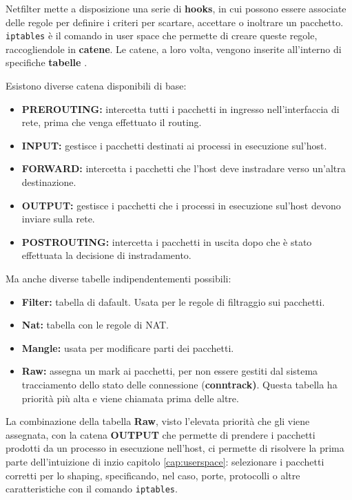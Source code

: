 \begin{defn}[Iptables]
  Netfilter mette a disposizione una serie di \textbf{hooks}, in cui possono essere associate delle regole per definire i criteri per scartare, accettare o inoltrare un pacchetto. \\
  \texttt{iptables} è il comando in user space che permette di creare queste regole, raccogliendole in \textbf{catene}.
  Le catene, a loro volta, vengono inserite all'interno di specifiche \textbf{tabelle} \cite{iptables}.
\end{defn}
Esistono diverse catena disponibili di base:
\begin{itemize}
  \item \textbf{PREROUTING:} intercetta tutti i pacchetti in ingresso nell'interfaccia di rete, prima che venga effettuato il routing.
  \item \textbf{INPUT:} gestisce i pacchetti destinati ai processi in esecuzione sul'host.
  \item \textbf{FORWARD:} intercetta i pacchetti che l'host deve instradare verso un'altra destinazione.
  \item \textbf{OUTPUT:} gestisce i pacchetti che i processi in esecuzione sul'host devono inviare sulla rete.
  \item \textbf{POSTROUTING:} intercetta i pacchetti in uscita dopo che è stato effettuata la decisione di instradamento.
\end{itemize}
Ma anche diverse tabelle indipendentementi possibili:
\begin{itemize}
  \item \textbf{Filter:} tabella di dafault. Usata per le regole di filtraggio sui pacchetti.
  \item \textbf{Nat:} tabella con le regole di NAT.
  \item \textbf{Mangle:} usata per modificare parti dei pacchetti.
  \item \textbf{Raw:} assegna un mark ai pacchetti, per non essere gestiti dal sistema tracciamento dello stato delle connessione (\textbf{conntrack)}.
    Questa tabella ha priorità più alta e viene chiamata prima delle altre.
\end{itemize}
La combinazione della tabella \textbf{Raw}, visto l'elevata priorità che gli viene assegnata, con la catena \textbf{OUTPUT} che permette di prendere i pacchetti
prodotti da un processo in esecuzione nell'host, ci permette di risolvere la prima parte dell'intuizione di inzio capitolo \ref{cap:userspace}:
selezionare i pacchetti corretti per lo shaping, specificando, nel caso, porte, protocolli o altre caratteristiche con il comando \texttt{iptables}.

